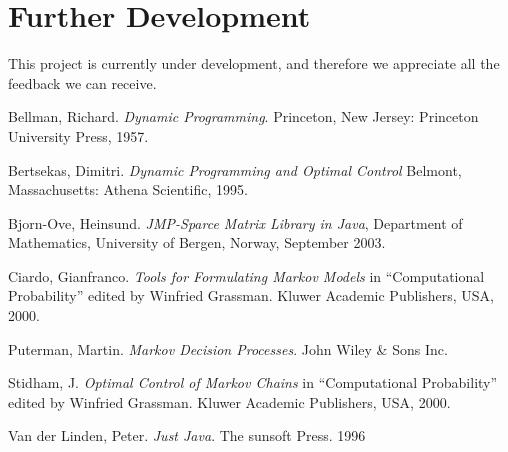 \documentclass[11pt]{article}
\begin{document}
\section{Further Development}

This project is currently under development, and therefore we appreciate all the feedback we can receive.



\begin{thebibliography}{Dillo 83}
 Bellman, Richard. \emph{Dynamic Programming}. Princeton, New Jersey: Princeton University Press, 1957.

 Bertsekas, Dimitri. \emph{Dynamic Programming and Optimal Control} Belmont, Massachusetts: Athena Scientific, 1995.

 Bjorn-Ove, Heinsund. \emph{JMP-Sparce Matrix Library in Java}, Department of Mathematics, University of Bergen, Norway, September 2003.

Ciardo, Gianfranco. \textit{Tools for Formulating Markov Models} in ``Computational Probability'' edited by Winfried Grassman. Kluwer Academic Publishers, USA, 2000.

 Puterman, Martin. \textit{Markov Decision Processes}. John Wiley \& Sons Inc.

 Stidham, J. \emph{Optimal Control of Markov Chains} in ``Computational Probability'' edited by Winfried Grassman. Kluwer Academic Publishers, USA, 2000.

 Van der Linden, Peter. \textit{Just Java}. The sunsoft
Press. 1996

\end{thebibliography}


\printindex
\end{document}
